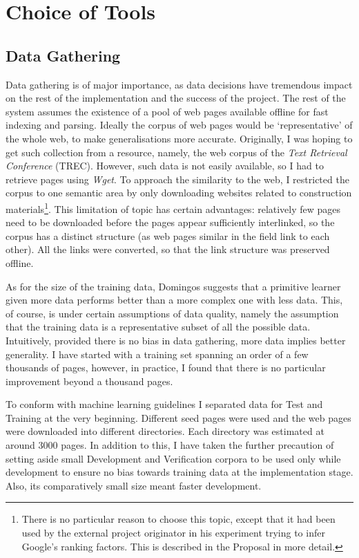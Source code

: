 \documentclass[12pt,notitlepage,twoside]{scrreprt}
\begin{document}
\section{Choice of Tools}

\subsection{Data Gathering}
Data gathering is of major importance, as data decisions have tremendous impact on the
rest of the implementation and the success of the project. The rest of the system assumes
the existence of a pool of web pages available offline for fast indexing and parsing.
Ideally the corpus of web pages would be `representative' of the whole web, to make
generalisations more accurate.  Originally, I was hoping to get such collection from a
resource, namely, the web corpus of the \textit{Text Retrieval Conference} (TREC).
However, such data is not easily available, so I had to retrieve pages using
\textit{Wget}. To approach the similarity to the web, I restricted the corpus to one
semantic area by only downloading websites related to construction
materials\footnote{There is no particular reason to choose this topic, except that it had
been used by the external project originator in his experiment trying to infer Google's
ranking factors. This is described in the Proposal in more detail.}. This limitation of
topic has certain advantages: relatively few pages need to be  downloaded before the pages
appear sufficiently interlinked, so the corpus has a distinct structure (as web pages
similar in the field link to each other). All the links were converted, so that the link
structure was preserved offline.

As for the size of the training data, Domingos \cite{domingos} suggests that a primitive
learner given more data performs better than a more complex one with less data.  This, of
course, is under certain assumptions of data quality, namely the assumption that the
training data is a representative subset of all the possible data. Intuitively, provided
there is no bias in data gathering, more data implies better generality. I have started
with a training set spanning an order of a few thousands of pages, however, in practice, I
found that there is no particular improvement beyond a thousand pages.

To conform with machine learning guidelines I separated data for Test and Training at the
very beginning. Different seed pages were used and the web pages were downloaded into
different directories.  Each directory was estimated at around 3000 pages. In addition to
this, I have taken the further precaution of setting aside small Development and
Verification corpora to be used only while development to ensure no bias towards training
data at the implementation stage. Also, its comparatively small size meant faster
development.
\end{document}
